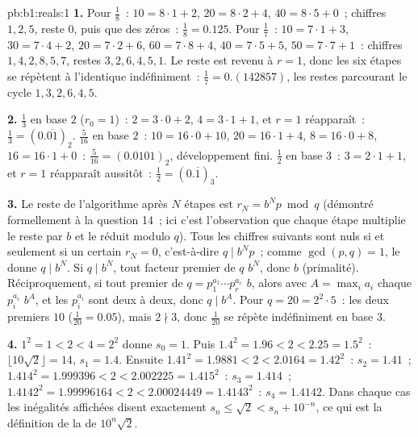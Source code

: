\begin{solution}{pb:b1:reals:1}
\textbf{1.} Pour $\frac 18$~: $10 = 8 \cdot 1 + 2$, $20 = 8 \cdot 2
+ 4$, $40 = 8 \cdot 5 + 0$~; chiffres $1, 2, 5$, reste $0$, puis
que des zéros~: $\frac 18 = 0.125$. Pour $\frac 17$~: $10 = 7 \cdot
1 + 3$, $30 = 7 \cdot 4 + 2$, $20 = 7 \cdot 2 + 6$, $60 = 7 \cdot 8
+ 4$, $40 = 7 \cdot 5 + 5$, $50 = 7 \cdot 7 + 1$~: chiffres $1, 4,
2, 8, 5, 7$, restes $3, 2, 6, 4, 5, 1$. Le reste est revenu à $r =
1$, donc les six étapes se répètent à l'identique indéfiniment~:
$\frac 17 = 0.(142857)$, les restes parcourant le cycle $1, 3, 2,
6, 4, 5$.

\textbf{2.} $\frac 13$ en base $2$ ($r_0 = 1$)~: $2 = 3 \cdot 0 +
2$, $4 = 3 \cdot 1 + 1$, et $r = 1$ réapparaît~: $\frac 13 =
(0.\overline{01})_2$. $\frac{5}{16}$ en base $2$~: $10 = 16 \cdot
0 + 10$, $20 = 16 \cdot 1 + 4$, $8 = 16 \cdot 0 + 8$, $16 = 16
\cdot 1 + 0$~: $\frac{5}{16} = (0.0101)_2$, développement fini.
$\frac 12$ en base $3$~: $3 = 2 \cdot 1 + 1$, et $r = 1$ réapparaît
aussitôt~: $\frac 12 = (0.\overline{1})_3$.

\textbf{3.} Le reste de l'algorithme après $N$ étapes est $r_N =
b^N p \bmod q$ (démontré formellement à la question 14~; ici c'est
l'observation que chaque étape multiplie le reste par $b$ et le
réduit modulo $q$). Tous les chiffres suivants sont nuls si et
seulement si un certain $r_N = 0$, c'est-à-dire $q \mid b^N p$~;
comme $\gcd(p, q) = 1$, le  donne $q \mid b^N$. Si $q
\mid b^N$, tout facteur premier de $q$  $b^N$, donc 
$b$ (primalité). Réciproquement, si tout premier de $q = p_1^{a_1}
\cdots p_r^{a_r}$  $b$, alors avec $A = \max_i a_i$ chaque
$p_i^{a_i}$  $b^A$, et les $p_i^{a_i}$ sont  deux à deux, donc $q \mid b^A$. Pour $q = 20 = 2^2 \cdot 5$~:
les deux premiers  $10$ ($\frac{1}{20} = 0.05$), mais $2
\nmid 3$, donc $\frac{1}{20}$ se répète indéfiniment en base $3$.

\textbf{4.} $1^2 = 1 < 2 < 4 = 2^2$ donne $s_0 = 1$. Puis $1.4^2
= 1.96 < 2 < 2.25 = 1.5^2$~: $\lfloor 10\sqrt 2 \rfloor = 14$,
$s_1 = 1.4$. Ensuite $1.41^2 = 1.9881 < 2 < 2.0164 = 1.42^2$~: $s_2
= 1.41$~; $1.414^2 = 1.999396 < 2 < 2.002225 = 1.415^2$~: $s_3 =
1.414$~; $1.4142^2 = 1.99996164 < 2 < 2.00024449 = 1.4143^2$~: $s_4
= 1.4142$. Dans chaque cas les inégalités affichées disent
exactement $s_n \leq \sqrt 2 < s_n + 10^{-n}$, ce qui est la
définition de la  de $10^n \sqrt 2$.


\end{solution}
